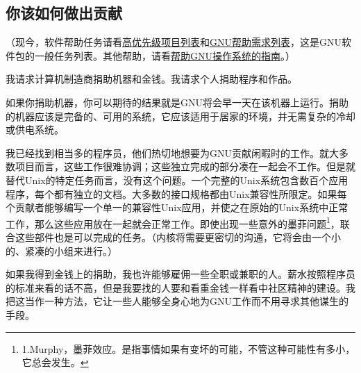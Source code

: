 \subsection{你该如何做出贡献}
（现今，软件帮助任务请看\href{http://fsf.org/campaigns/priority-projects}{高优先级项目列表}和\href{http://savannah.gnu.org/people/?type_id=1}{GNU帮助需求列表}，这是GNU软件包的一般任务列表。其他帮助，请看\href{http://www.gnu.org/help/help.html}{帮助GNU操作系统的指南}。）\par
我请求计算机制造商捐助机器和金钱。我请求个人捐助程序和作品。\par
如果你捐助机器，你可以期待的结果就是GNU将会早一天在该机器上运行。捐助的机器应该是完备的、可用的系统，它应该适用于居家的环境，并无需复杂的冷却或供电系统。\par
我已经找到相当多的程序员，他们热切地想要为GNU贡献闲暇时的工作。就大多数项目而言，这些工作很难协调；这些独立完成的部分凑在一起会不工作。但是就替代Unix的特定任务而言，没有这个问题。一个完整的Unix系统包含数百个应用程序，每个都有独立的文档。大多数的接口规格都由Unix兼容性所限定。如果每个贡献者能够编写一个单一的兼容性Unix应用，并使之在原始的Unix系统中正常工作，那么这些应用放在一起就会正常工作。即使出现一些意外的墨菲问题\footnote{1.Murphy，墨菲效应。是指事情如果有变坏的可能，不管这种可能性有多小，它总会发生。}，联合这些部件也是可以完成的任务。（内核将需要更密切的沟通，它将会由一个小的、紧凑的小组来进行。）\par
如果我得到金钱上的捐助，我也许能够雇佣一些全职或兼职的人。薪水按照程序员的标准来看的话不高，但是我要找的人要和看重金钱一样看中社区精神的建设。我把这当作一种方法，它让一些人能够全身心地为GNU工作而不用寻求其他谋生的手段。
